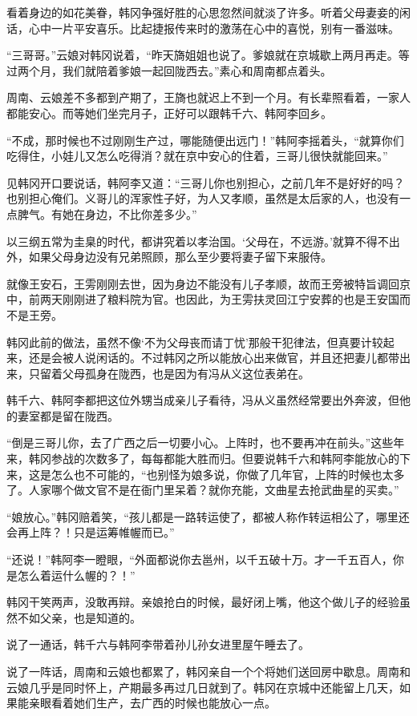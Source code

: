 看着身边的如花美眷，韩冈争强好胜的心思忽然间就淡了许多。听着父母妻妾的闲话，心中一片平安喜乐。比起捷报传来时的激荡在心中的喜悦，别有一番滋味。

“三哥哥。”云娘对韩冈说着，“昨天旖姐姐也说了。爹娘就在京城歇上两月再走。等过两个月，我们就陪着爹娘一起回陇西去。”素心和周南都点着头。

周南、云娘差不多都到产期了，王旖也就迟上不到一个月。有长辈照看着，一家人都能安心。而等她们坐完月子，正好可以跟韩千六、韩阿李回乡。

“不成，那时候也不过刚刚生产过，哪能随便出远门！”韩阿李摇着头，“就算你们吃得住，小娃儿又怎么吃得消？就在京中安心的住着，三哥儿很快就能回来。”

见韩冈开口要说话，韩阿李又道：“三哥儿你也别担心，之前几年不是好好的吗？也别担心俺们。义哥儿的浑家性子好，为人又孝顺，虽然是太后家的人，也没有一点脾气。有她在身边，不比你差多少。”

以三纲五常为圭臬的时代，都讲究着以孝治国。‘父母在，不远游。’就算不得不出外，如果父母身边没有兄弟照顾，那么至少要将妻子留下来服侍。

就像王安石，王雱刚刚去世，因为身边不能没有儿子孝顺，故而王旁被特旨调回京中，前两天刚刚进了粮料院为官。也因此，为王雱扶灵回江宁安葬的也是王安国而不是王旁。

韩冈此前的做法，虽然不像‘不为父母丧而请丁忧’那般干犯律法，但真要计较起来，还是会被人说闲话的。不过韩冈之所以能放心出来做官，并且还把妻儿都带出来，只留着父母孤身在陇西，也是因为有冯从义这位表弟在。

韩千六、韩阿李都把这位外甥当成亲儿子看待，冯从义虽然经常要出外奔波，但他的妻室都是留在陇西。

“倒是三哥儿你，去了广西之后一切要小心。上阵时，也不要再冲在前头。”这些年来，韩冈参战的次数多了，每每都能大胜而归。但要说韩千六和韩阿李能放心的下来，这是怎么也不可能的，“也别怪为娘多说，你做了几年官，上阵的时候也太多了。人家哪个做文官不是在衙门里呆着？就你充能，文曲星去抢武曲星的买卖。”

“娘放心。”韩冈赔着笑，“孩儿都是一路转运使了，都被人称作转运相公了，哪里还会再上阵？！只是运筹帷幄而已。”

“还说！”韩阿李一瞪眼，“外面都说你去邕州，以千五破十万。才一千五百人，你是怎么着运什么幄的？！”

韩冈干笑两声，没敢再辩。亲娘抢白的时候，最好闭上嘴，他这个做儿子的经验虽然不如父亲，也是知道的。

说了一通话，韩千六与韩阿李带着孙儿孙女进里屋午睡去了。

说了一阵话，周南和云娘也都累了，韩冈亲自一个个将她们送回房中歇息。周南和云娘几乎是同时怀上，产期最多再过几日就到了。韩冈在京城中还能留上几天，如果能亲眼看着她们生产，去广西的时候也能放心一点。


